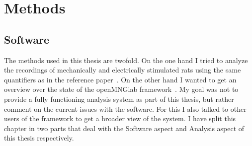 \chapter{Methods}
\begin{comment}
In this chapter I will describe the methods I used for creating the software and spike analysis results in this thesis\\
-Describe the different data structures (Neo, old openMNGlab version)\\
-Detail the development process, issues during development and how they were resolved\\
-Describe the finished analysis pipeline with the help of a simplified graph\\
-present use cases (3 students analysing different data, experimental scientist)\\

Spike Analysis:\\
-Data\\
-definition of spike trains\\
-quantifiers\\

TODO:\\
-Add what I did: somewhat detailed description of my process in developing the notebook\\
-start from the notebook which was started by Radomir for custom structure (before openMNGlab)\\
-adding of importers from old openMNGlab version (code from Fabian)\\
-adding of neo importers after integration into openMNGlab\\
\end{comment}
\section{Software}
The methods used in this thesis are twofold. On the one hand I tried to analyze the recordings of mechanically and electrically stimulated rats using the same quantifiers as in the reference paper~\cite{roberto}. On the other hand I wanted to get an overview over the state of the openMNGlab framework~\cite{schlebusch_openmnglab_2021}. My goal was not to provide a fully functioning analysis system as part of this thesis, but rather comment on the current issues with the software. For this I also talked to other users of the framework to get a broader view of the system.
I have split this chapter in two parts that deal with the Software aspect and Analysis aspect of this thesis respectively.


